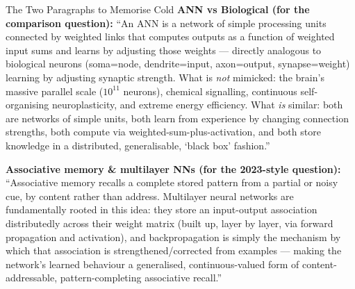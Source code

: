 \documentclass[12pt,a4paper]{article}
\begin{document}
\begin{keybox}{The Two Paragraphs to Memorise Cold}
\textbf{ANN vs Biological (for the comparison question):} ``An ANN is a network of simple processing units connected by weighted links that computes outputs as a function of weighted input sums and learns by adjusting those weights --- directly analogous to biological neurons (soma=node, dendrite=input, axon=output, synapse=weight) learning by adjusting synaptic strength. What is \emph{not} mimicked: the brain's massive parallel scale ($10^{11}$ neurons), chemical signalling, continuous self-organising neuroplasticity, and extreme energy efficiency. What \emph{is} similar: both are networks of simple units, both learn from experience by changing connection strengths, both compute via weighted-sum-plus-activation, and both store knowledge in a distributed, generalisable, `black box' fashion.''

\textbf{Associative memory \& multilayer NNs (for the 2023-style question):} ``Associative memory recalls a complete stored pattern from a partial or noisy cue, by content rather than address. Multilayer neural networks are fundamentally rooted in this idea: they store an input-output association distributedly across their weight matrix (built up, layer by layer, via forward propagation and activation), and backpropagation is simply the mechanism by which that association is strengthened/corrected from examples --- making the network's learned behaviour a generalised, continuous-valued form of content-addressable, pattern-completing associative recall.''
\end{keybox}
\end{document}
